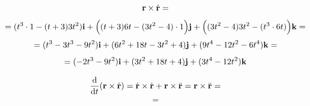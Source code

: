\documentclass{article}
\begin{document}
\begin{equation*}
    \vb{r} \times \dot{\vb{r}} = 
\end{equation*}
\begin{equation*}
    = (t^3 \cdot 1 - (t+3)3t^{2})\vb{i} + \Big((t+3)6t - (3t^{2} - 4) \cdot 1\Big)\vb{j} + \Big((3t^{2} - 4)3t^{2} - (t^{3} \cdot 6t)\Big)\vb{k} =
\end{equation*}
\begin{equation*}
    = (t^3 - 3t^{3} - 9t^2)\vb{i} + (6t^2 + 18t - 3t^2 + 4)\vb{j} + (9t^4 - 12t^2 - 6t^4)\vb{k} =
\end{equation*}
\begin{equation*}
    = (-2t^{3} - 9t^{2})\vb{i} + (3t^{2} + 18t + 4)\vb{j} + (3t^{4} - 12t^{2})\vb{k}
\end{equation*}

\begin{equation*}
    \dv{t}(\vb{r} \times \dot{\vb{r}}) = \dot{\vb{r}} \times \dot{\vb{r}} + \vb{r} \times \ddot{\vb{r}} = \vb{r} \times \ddot{\vb{r}} =
\end{equation*}
\begin{equation*}
    = 
\end{equation*}
\end{document}
